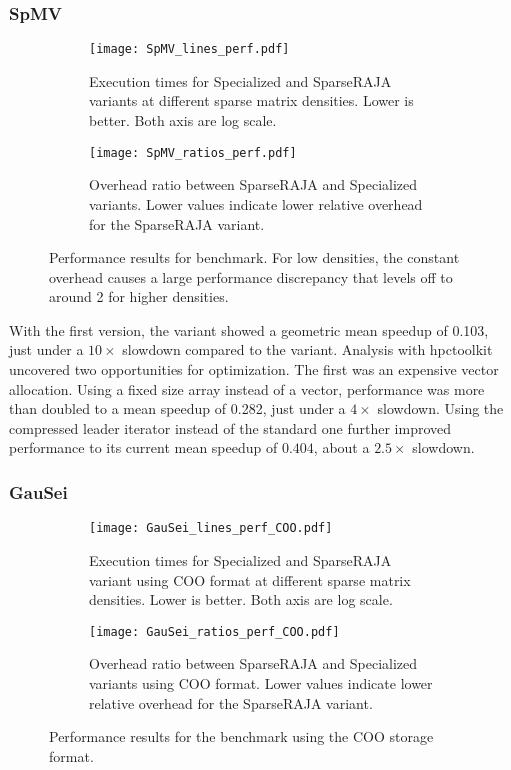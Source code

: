 \subsubsection{SpMV}
\begin{figure}
  \begin{subfigure}{0.49\columnwidth}
    \texttt{[image: SpMV\_lines\_perf.pdf]}
    \caption{Execution times for Specialized and SparseRAJA variants at different sparse matrix densities. Lower is better. Both axis are log scale.}\label{SpMVExecTime}
  \end{subfigure}
  \hspace{0.02\columnwidth}
  \begin{subfigure}{0.49\columnwidth}
    \texttt{[image: SpMV\_ratios\_perf.pdf]}
    \caption{Overhead ratio between SparseRAJA and Specialized variants. Lower values indicate lower relative overhead for the SparseRAJA variant.}\label{SpMVRatios}
  \end{subfigure}
  \caption{Performance results for \SpMV{} benchmark. For low densities, the constant overhead causes a large performance discrepancy that levels off to around 2 for higher densities.}\label{SpMVPerformance}
\end{figure}

With the first version, the \sparseraja{} variant showed a geometric mean speedup of 0.103, just under a $10\times$ slowdown compared to the \specialized{} variant.
Analysis with hpctoolkit uncovered two opportunities for optimization.
The first was an expensive vector allocation. 
Using a fixed size array instead of a vector, performance was more than doubled to a mean speedup of 0.282, just under a $4\times$ slowdown.
Using the compressed leader iterator instead of the standard one further improved performance to its current mean speedup of $0.404$, about a $2.5\times$ slowdown.




\subsubsection{GauSei}
\begin{figure}
  \begin{subfigure}{0.49\columnwidth}
    \texttt{[image: GauSei\_lines\_perf\_COO.pdf]}
    \caption{Execution times for Specialized and SparseRAJA variant using COO format at different sparse matrix densities. Lower is better. Both axis are log scale.}\label{GauSeiExecTimeCOO}
  \end{subfigure}
  \hspace{0.02\columnwidth}
  \begin{subfigure}{0.49\columnwidth}
    \texttt{[image: GauSei\_ratios\_perf\_COO.pdf]}
    \caption{Overhead ratio between SparseRAJA and Specialized variants using COO format. Lower values indicate lower relative overhead for the SparseRAJA variant.}\label{GauSeiRatioCOO}
  \end{subfigure}
  \caption{Performance results for the \GauSei{} benchmark using the COO storage format. }\label{GauSeiPerfCOO}
\end{figure}


